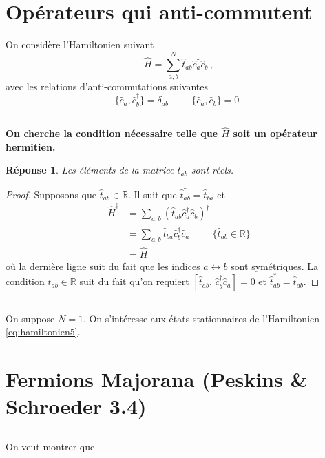 \documentclass{article}
\numberwithin{equation}{section}
\theoremstyle{solution}
\newtheorem{solution}{Réponse}[section]
\begin{document}
        

\section{Opérateurs qui anti-commutent}
On considère l'Hamiltonien suivant
\begin{equation}\label{eq:hamiltonien5}
       \hat{H} = \sum_{a, b}^{N} \hat{t}_{ab}\hat{c}^{\dagger}_a \hat{c}_b \, ,
\end{equation} 
avec les relations d'anti-commutations suivantes
\begin{equation}
        \{\hat{c}_a, \hat{c}^{\dagger}_b \} = \delta_{ab} \hspace{1cm} \{ \hat{c}_a, \hat{c}_b\} = 0\, .
\end{equation} 

\subsection{}
\textbf{On cherche la condition nécessaire telle que $\hat{H}$ soit un opérateur hermitien.}
\begin{solution}
        Les éléments de la matrice $t_{ab}$ sont réels.
\end{solution}
\begin{proof}
Supposons que $\hat{t}_{ab} \in \mathbb{R}$. Il suit que $\hat{t}^{\dagger}_{ab} = \hat{t}_{ba}$ et
\begin{align*}
       \hat{H}^{\dagger} &=  \sum_{a,b}(\hat{t}_{ab}\hat{c}^{\dagger}_a \hat{c}_b)^{\dagger} \\
                         &= \sum_{a,b} \hat{t}_{ba} \hat{c}^{\dagger}_b \hat{c}_a \hspace{1cm} \{\hat{t}_{ab} \in \mathbb{R}\}\\
                         &= \hat{H}
\end{align*} 
où la dernière ligne suit du fait que les indices $a \leftrightarrow b$ sont symétriques.
La condition $\hat{t}_{ab} \in \mathbb{R}$ suit du fait qu'on requiert $[\hat{t}_{ab},\, \hat{c}^{\dagger}_b \hat{c}_a] = 0$ et $\hat{t}_{ab}^{*} = \hat{t}_{ab}$.
\end{proof}

\subsection{}
On suppose $N=1$. On s'intéresse aux états stationnaires de l'Hamiltonien \eqref{eq:hamiltonien5}.


\subsection{}

\section{Fermions Majorana (Peskins \& Schroeder 3.4)}

\subsection{}
On veut montrer que
\end{document}
